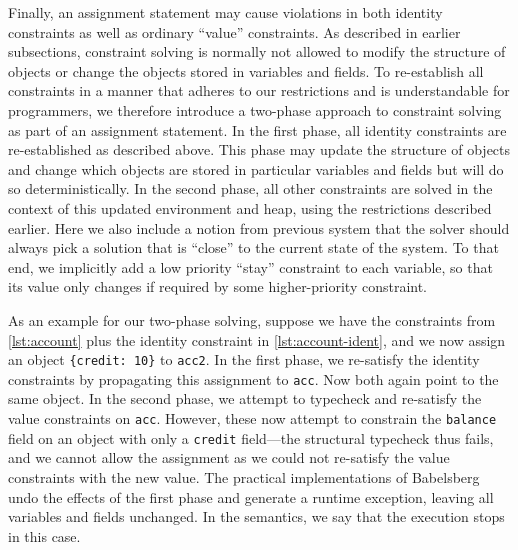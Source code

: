 \documentclass[10pt,reprint]{sigplanconf-preprint}
\begin{document}
Finally, an assignment statement may cause violations in both identity
constraints as well as ordinary ``value'' constraints.  As described
in earlier subsections, constraint solving is normally not allowed to modify
the structure of objects or change the objects stored in variables and
fields.  To
re-establish all constraints in a manner that adheres to our
restrictions and is understandable for programmers, we therefore introduce a two-phase approach to
constraint solving as part of an assignment statement. 
In the first phase, all identity constraints are
re-established as described above.  This phase may update the
structure of objects and change which objects are stored in particular
variables and fields but will do so deterministically.  In the second phase, all other
constraints are solved in the context of this updated environment and
heap, using the restrictions described earlier.
Here we also include a notion from previous system
\cite{freeman-benson-ecoop-1992} that the solver should always pick a
solution that is ``close'' to the current state of the system. To that
end, we implicitly add a low priority ``stay'' constraint to each
variable, so that its value only changes if required by some
higher-priority constraint.

\begin{sloppypar}
As an example for our two-phase solving, suppose we have the
constraints from \autoref{lst:account} plus the identity constraint in
\autoref{lst:account-ident}, and we now assign an object
\verb!{credit: 10}! to \verb!acc2!. In the first phase, we re-satisfy
the identity constraints by propagating this assignment to
\verb!acc!. Now both again point to the same object. In the second
phase, we attempt to typecheck and re-satisfy the value constraints on
\verb!acc!. However, these now attempt to constrain the \verb!balance!
field on an object with only a \verb!credit! field---the structural
typecheck thus fails, and we cannot allow the assignment as we could
not re-satisfy the value constraints with the new value. The practical
implementations of Babelsberg undo the effects of the first phase and
generate a runtime exception, leaving all variables and fields
unchanged. In the semantics, we say that the execution stops in this case.
\end{sloppypar}

\end{document}
